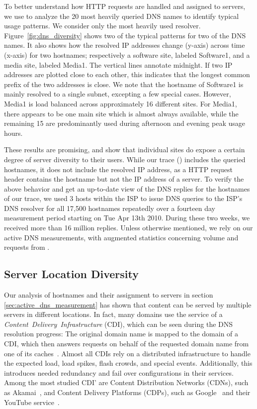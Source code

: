 To better understand how HTTP requests are handled and assigned to servers, we
use \dnslong to analyze the 20 most heavily queried DNS names to identify
typical usage patterns. We consider only the most heavily used resolver.
Figure~\ref{fig:dns_diversity} shows two of the typical patterns for two of the
DNS names. It also shows how the resolved IP addresses change (y-axis) across
time (x-axis) for two hostnames; respectively a software site, labeled
Software1, and a media site, labeled Media1. The vertical lines annotate
midnight. If two IP addresses are plotted close to each other, this indicates
that the longest common prefix of the two addresses is close. We note that the
hostname of Software1 is mainly resolved to a single subnet, excepting a few
special cases. However, Media1 is load balanced across approximately 16
different sites. For Media1, there appears to be one main site which is almost
always available, while the remaining 15 are predominantly used during
afternoon and evening peak usage hours.

These results are promising, and show that individual sites do expose a certain
degree of server diversity to their users. While our trace (\httplong) includes
the queried hostnames, it does not include the resolved IP address, as a HTTP
request header contains the hostname but not the IP address of a server. To
verify the above behavior and get an up-to-date view of the DNS replies for the
hostnames of our trace, we used 3 hosts within the ISP to issue DNS queries to
the ISP's DNS resolver for all 17,500 hostnames repeatedly over a fourteen day
measurement period starting on Tue Apr 13th 2010. During these two weeks, we
received more than 16 million replies. Unless otherwise mentioned, we rely on
our active DNS measurements, with augmented statistics concerning volume and
requests from \httplong.

\subsection{Server Location Diversity}\label{sec:server_location_diversity}


Our analysis of hostnames and their assignment to servers in section
\ref{sec:active_dns_measurement} has shown that content can be served by
multiple servers in different locations. In fact, many domains use the service
of a \textit{Content~Delivery~Infrastructure} (CDI), which can be seen during
the DNS resolution progress: The original domain name is mapped to the domain
of a CDI, which then answers requests on behalf of the requested domain name
from one of its caches~\cite{DraftingAkamai:SIGCOMM2006}. Almost all CDIs rely
on a distributed infrastructure to handle the expected load, load spikes, flash
crowds, and special events. Additionally, this introduces needed redundancy and
fail over configurations in their services. Among the most studied CDI' are
Content Distribution Networks (CDNs), such as Akamai~\cite
{ImprovingPerformanceInternet2009, DraftingAkamai:SIGCOMM2006,
MeasuringAndEvaluating2008}, and Content Delivery Platforms (CDPs), such as
Google~\cite{MovingBeyondE2E2009} and their YouTube service~\cite {YouTube}.

